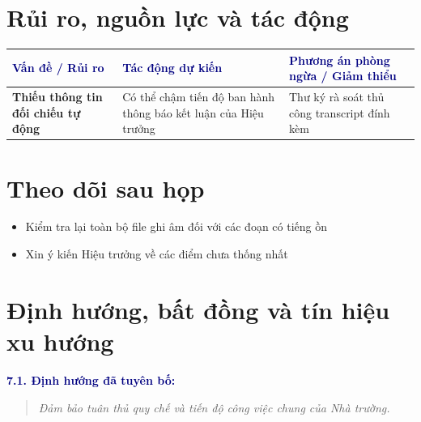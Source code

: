 \documentclass[11pt,a4paper]{article}
\begin{document}
\section{Rủi ro, nguồn lực và tác động}

\begin{tabularx}{\textwidth}{@{}>{\raggedright\arraybackslash\bfseries}p{3.6cm} >{\raggedright\arraybackslash}X >{\raggedright\arraybackslash}p{4.8cm}@{}}
  \toprule
  \rowcolor{light}
  \textcolor{navy}{Vấn đề / Rủi ro} & \textcolor{navy}{Tác động dự kiến} & \textcolor{navy}{Phương án phòng ngừa / Giảm thiểu} \\
  \midrule
  Thiếu thông tin đối chiếu tự động & Có thể chậm tiến độ ban hành thông báo kết luận của Hiệu trưởng & Thư ký rà soát thủ công transcript đính kèm \\
  \midrule
  \bottomrule
\end{tabularx}

\section{Theo dõi sau họp}

\begin{itemize}[leftmargin=1.5em, itemsep=3pt]
  \item Kiểm tra lại toàn bộ file ghi âm đối với các đoạn có tiếng ồn
  \item Xin ý kiến Hiệu trưởng về các điểm chưa thống nhất
\end{itemize}

\section{Định hướng, bất đồng và tín hiệu xu hướng}

\textbf{\textcolor{navy}{7.1. Định hướng đã tuyên bố:}}
\begin{quote}
  \textit{ Đảm bảo tuân thủ quy chế và tiến độ công việc chung của Nhà trường. }
\end{quote}
\end{document}
